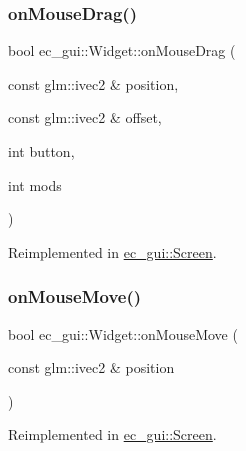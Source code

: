 \mbox{\label{classec__gui_1_1_widget_aacc1a265d66b1127f8f4ae968f43ae25}} 
\subsubsection{\texorpdfstring{on\+Mouse\+Drag()}{onMouseDrag()}}
{\footnotesize\ttfamily bool ec\+\_\+gui\+::\+Widget\+::on\+Mouse\+Drag (\begin{DoxyParamCaption}\item[{const glm\+::ivec2 \&}]{position,  }\item[{const glm\+::ivec2 \&}]{offset,  }\item[{int}]{button,  }\item[{int}]{mods }\end{DoxyParamCaption})\hspace{0.3cm}{\ttfamily [virtual]}}



Reimplemented in \mbox{\hyperlink{classec__gui_1_1_screen_aac1958cf78cf6194ffcf347fa49ad65a}{ec\+\_\+gui\+::\+Screen}}.

\mbox{\label{classec__gui_1_1_widget_a22a477e900743ebc57db7703609d7bcc}} 
\subsubsection{\texorpdfstring{on\+Mouse\+Move()}{onMouseMove()}}
{\footnotesize\ttfamily bool ec\+\_\+gui\+::\+Widget\+::on\+Mouse\+Move (\begin{DoxyParamCaption}\item[{const glm\+::ivec2 \&}]{position }\end{DoxyParamCaption})\hspace{0.3cm}{\ttfamily [virtual]}}



Reimplemented in \mbox{\hyperlink{classec__gui_1_1_screen_a9dc8a7c1650bb6ffb271d13bdea3688a}{ec\+\_\+gui\+::\+Screen}}.

\mbox{\label{classec__gui_1_1_widget_a895600dcaf4c40a39828ac01791e199e}} 
